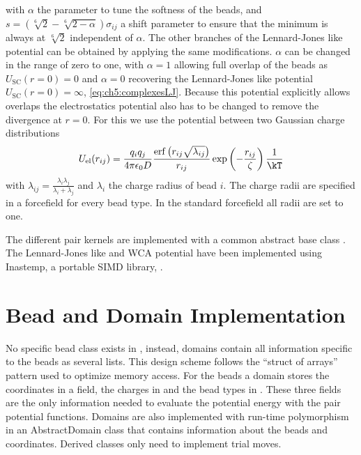 \documentclass[12pt, twoside]{report}
\begin{document}
with \(\alpha\) the parameter to tune the softness of the beads, and
$s=\left(\sqrt[6]{2} - \sqrt[6]{2-\alpha}\right) \sigma_{ij}$ a shift parameter
to ensure that the minimum is always at \(\sqrt[6]{2}\) independent of
\(\alpha\). The other branches of the Lennard-Jones like potential can be
obtained by applying the same modifications. \(\alpha\) can be changed in the
range of zero to one, with \(\alpha=1\) allowing full overlap of the beads as
\(U_{\mathrm{SC}}(r=0)=0\) and \(\alpha=0\) recovering the Lennard-Jones like
potential \(U_{\mathrm{SC}}(r=0)=\infty\), \cref{eq:ch5:complexesLJ}. Because
this potential explicitly allows overlaps the electrostatics potential also has
to be changed to remove the divergence at \(r=0\). For this we use the potential
between two Gaussian charge distributions \cite{yarkony1995}
\begin{align}
  U_{\mathrm{el}}(r_{ij}) = \frac{q_i q_j}{4 \pi \epsilon_0
D}\frac{\mathrm{erf}\left(r_{ij}\sqrt{\lambda_{ij}}\right)}{r_{ij}}
\exp\left(-\frac{r_{ij}}{\zeta}\right) \frac{1}{\kT}
\end{align}
with \(\lambda_{ij}=\frac{\lambda_i \lambda_j}{\lambda_i + \lambda_j}\) and
\(\lambda_i\) the charge radius of bead \(i\). The charge radii are specified in
a forcefield for every bead type. In the standard \complexes forcefield all
radii are set to one.

The different pair kernels are implemented with a common abstract base class
. The Lennard-Jones like and \gls{WCA} potential
have been implemented using Inastemp, a portable \gls{SIMD} library,
\cite{Bramas2017}.

\section{Bead and Domain Implementation}

No specific bead class exists in \complexes, instead, domains contain all
information specific to the beads as several lists. This design scheme follows
the ``struct of arrays'' pattern \cite{wikiAOS} used to optimize memory access.
For the beads a domain stores the coordinates in a  field,
the charges in  and the bead types in
. These three fields are the only information needed to
evaluate the potential energy with the pair potential functions. Domains are
also implemented with run-time polymorphism in an AbstractDomain class that
contains information about the beads and coordinates. Derived classes only need
to implement trial moves.
\end{document}
